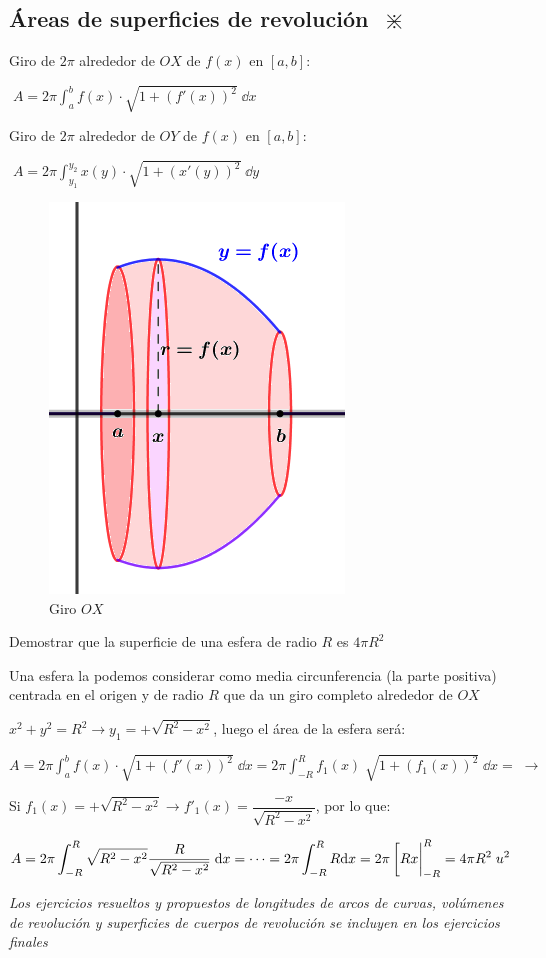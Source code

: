 \subsection{Áreas de superficies de revolución $\; \divideontimes$}
\begin{multicols}{2}
Giro de $2\pi$ alrededor de $OX$ de $f(x)$  en $[a,b]$:

\hspace{10mm} $\boxed{\;\displaystyle A=2\pi\int_a^b f(x)\cdot \sqrt{1+(f'(x))^2}\; \dd x  \;}$



Giro de $2\pi$ alrededor de $OY$ de $f(x)$  en $[a,b]$:

\hspace{10mm} $\boxed{\;\displaystyle A=2\pi\int_{y_1}^{y_2} x(y)\cdot \sqrt{1+(x'(y))^2}\; \dd y  \;}$

	\begin{figure}[H]
	\centering
	\includegraphics[width=.3\textwidth]{imagenes/imagenes08/T08IM29.png}
	\caption{Giro $OX$}
	\end{figure}
	
\end{multicols}
\begin{ejem}
Demostrar que la superficie de una esfera de radio $R$ es $4\pi R^2$	

\vspace{2mm}

Una esfera la podemos considerar como media circunferencia (la parte positiva) centrada en el origen y de radio $R$ que da un giro completo alrededor de $OX$

$x^2+y^2=R^2 \to y_1=+\sqrt{R^2-x^2}$, luego el área de la esfera será:

$\displaystyle A=2\pi\int_a^b f(x)\cdot \sqrt{1+(f'(x))^2}\; \dd x = 2\pi\int_{-R}^R f_1(x)\; \sqrt{1+(f_1(x))^2}\; \dd x= \; \to $

Si $f_1(x)=+\sqrt{R^2-x^2} \to f'_1(x)= \dfrac {-x}{\sqrt{R^2-x^2}}$, por lo que:

$A=\displaystyle 2\pi\int_{-R}^R \sqrt{R^2-x^2}\dfrac {R}{\sqrt{R^2-x^2}}\; \dd x =\cdots = 2\pi\int_{-R}^R R \dd x= 2\pi \eval [Rx|_{-R}^R= 4\pi R^2 \; u^2$

\emph{Los ejercicios resueltos y propuestos de longitudes de arcos de curvas, volúmenes de revolución y superficies de cuerpos de revolución se incluyen en los ejercicios finales}
\end{ejem}

